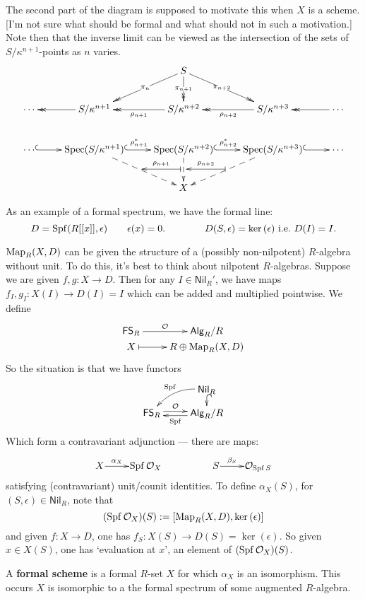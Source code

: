 \documentclass[11pt]{article}
\newcommand{\RAlg}{\mathsf{Alg}_R}
\newcommand{\RNil}{\mathsf{Nil}_R}
\newcommand{\FSR}{\mathsf{FS}_R}
\DeclareMathOperator{\SPf}{Spf}
\begin{document}
\begin{itemise}
The second part of the diagram is supposed to motivate this when $X$ is a scheme. [I'm not sure what should be formal and what should not in such a motivation.] Note then that the inverse limit can be viewed as the intersection of the sets of $S/\kappa^{n+1}$-points as $n$ varies.
\[\xymatrix{
&%
&%
S
\ar@{->>}[d]|-{\pi_{n+1}}
\ar@{->>}[dl]|-{\pi_{n}}
\ar@{->>}[dr]|-{\pi_{n+2}}
&%
&%
\\%
\cdots 
&%
S/\kappa^{n+1}
\ar@{->>}[l]
&%
S/\kappa^{n+2}
\ar@{->>}[l]^-{\rho_{n+1}}
&%
S/\kappa^{n+3}
\ar@{->>}[l]^-{\rho_{n+2}}
&%
\cdots 
\ar@{->>}[l]
\\%
\cdots 
&%
\Spec(S/\kappa^{n+1})
\ar@{^{(}->}[l];[]
\ar@{-->}[dr]^{}="1"_{}="2"
&%
\Spec(S/\kappa^{n+2})
\ar@{^{(}->}[l];[]^-{\rho_{n+1}^*}
\ar@{-->}[d]^{}="3"_{}="4"
&%
\Spec(S/\kappa^{n+3})
\ar@{^{(}->}[l];[]^-{\rho_{n+2}^*}
\ar@{-->}[dl]^{}="5"_{}="6"
&%
\cdots 
\ar@{^{(}->}[l];[]
\\
&&X
\ar@{|->}"3";"2"_-{\rho_{n+1}}
\ar@{|->}"5";"4"_-{\rho_{n+2}}
}\]
\item As an example of a formal spectrum, we have the formal line:
\[D=\SPf(R[[x]],\epsilon)\qquad \epsilon(x)=0.\qquad \qquad D(S,\epsilon)=\ker(\epsilon)\textup{ i.e.\ }D(I)=I.\]
\item $\operatorname{Map}_R(X,D)$ can be given the structure of a (possibly non-nilpotent) $R$-algebra without unit. To do this, it's best to think about nilpotent $R$-algebras. Suppose we are given $f,g:X\to D$. Then for any $I\in\RNil'$, we have maps $f_I,g_I:X(I)\to D(I)=I$ which can be added and multiplied pointwise. We define
\[\xymatrix@R=0mm{
\ar[r]^-{\calO}%
\FSR&%
\RAlg/R\\%
X%
\ar@{|->}[r]&
R\oplus \Map_R(X,D)%
}\]
So the situation is that we have functors
\[\xymatrix@R=.3cm{
&%
\RNil
\ar@/_1em/[ld]_-{\SPf}
\ar@{^{(}->}[d]
\\%
\FSR
\ar@<+.51ex>[r]^-{\calO}
&%
\RAlg/R
\ar@<+.51ex>[l]^-{\SPf}
}\]
Which form a contravariant adjunction --- there are maps:
\[
\vcenter{\xymatrix@1{
X
\ar[r]^-{\alpha_X}
&%
\SPf\calO_X
&%
&%
S
\ar[r]^-{\beta_S}
&%
\calO_{\SPf S}
}}\]
satisfying (contravariant) unit/counit identities.
To define $\alpha_X(S)$, for $(S,\epsilon)\in\RNil$, note that
\[(\SPf\calO_X)(S):=[\Map_R(X,D),\ker(\epsilon)]\]
and given $f:X\to D$, one has $f_S:X(S)\to D(S)=\ker(\epsilon)$. So given $x\in X(S)$, one has `evaluation at $x$', an element of $(\SPf\calO_X)(S)$. 
\item A \textbf{formal scheme} is a formal $R$-set $X$ for which $\alpha_X$ is an isomorphism. This occurs \Iff $X$ is isomorphic to a the formal spectrum of some augmented $R$-algebra.
\end{itemise}
\end{document}

